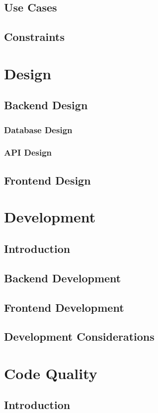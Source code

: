 \documentclass[a4paper,11pt]{report}
\begin{document}
\section{Use Cases}
\section{Constraints}

\chapter{Design}
\section{Backend Design}
\subsection{Database Design}
\subsection{API Design}
\section{Frontend Design}

\chapter{Development}
\section{Introduction}
\section{Backend Development}
\section{Frontend Development}
\section{Development Considerations}

\chapter{Code Quality}
\section{Introduction}
\end{document}
